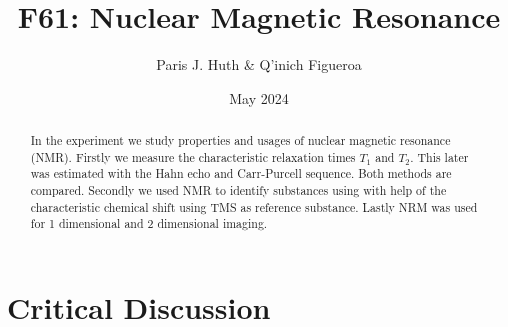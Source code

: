 \documentclass[11 pt]{article}
\title{F61: Nuclear Magnetic Resonance}
\author{Paris J. Huth \& Q'inich Figueroa}
\date{May 2024}
\begin{document}
\maketitle
\begin{center}
\begin{abstract}
In the experiment we study properties and usages of nuclear magnetic resonance (NMR). Firstly we measure the characteristic relaxation times $T_1$ and $T_2$. This later was estimated with the Hahn echo and Carr-Purcell sequence. Both methods are compared. Secondly we used NMR to identify substances using with help of the characteristic chemical shift using TMS as reference substance. Lastly NRM was used for 1 dimensional and 2 dimensional imaging.  
\end{abstract}
\end{center}

%
%

\section{Critical Discussion}
\end{document}
